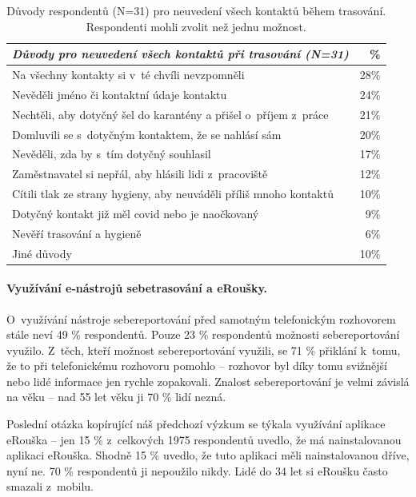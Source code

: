 \begin{table}
\begin{center}
\begin{tabular}{|l|r|}
\hline
\emph{Důvody pro neuvedení všech kontaktů při trasování (N=31)} &  \% \\
\hline \hline
Na všechny kontakty si v~té chvíli nevzpomněli & 28\% \\
Nevěděli jméno či kontaktní údaje kontaktu & 24\% \\
Nechtěli, aby dotyčný šel do karantény a přišel o~příjem z~práce & 21\% \\
Domluvili se s~dotyčným kontaktem, že se nahlásí sám & 20\% \\
Nevěděli, zda by s~tím dotyčný souhlasil & 17\% \\
Zaměstnavatel si nepřál, aby hlásili lidi z~pracoviště & 12\% \\
Cítili tlak ze strany hygieny, aby neuváděli příliš mnoho kontaktů & 10\% \\
Dotyčný kontakt již měl covid nebo je naočkovaný & 9\% \\
Nevěří trasování a hygieně & 6\% \\
Jiné důvody & 10\% \\
\hline
\end{tabular}
\end{center}
\caption{Důvody respondentů (N=31) pro neuvedení všech kontaktů během trasování. Respondenti mohli zvolit než jednu možnost.}
\end{table}

\paragraph*{Využívání e-nástrojů sebetrasování a eRoušky.}
O~využívání nástroje sebereportování před samotným telefonickým rozhovorem stále neví 49 \% respondentů. Pouze 23 \% respondentů možnosti sebereportování využilo. Z~těch, kteří možnost sebereportování využili, se 71 \% přiklání k~tomu, že to při telefonickému rozhovoru pomohlo -- rozhovor byl díky tomu svižnější nebo lidé informace jen rychle zopakovali. Znalost sebereportování je velmi závislá na věku -- nad 55 let věku ji 70 \% lidí nezná. 

Poslední otázka kopírující náš předchozí výzkum se týkala využívání aplikace eRouška -- jen 15 \% z~celkových 1975 respondentů uvedlo, že má nainstalovanou aplikaci eRouška. Shodně 15 \% uvedlo, že tuto aplikaci měli nainstalovanou dříve, nyní ne. 70 \% respondentů ji nepoužilo nikdy. Lidé do 34 let si eRoušku často smazali z~mobilu. 

